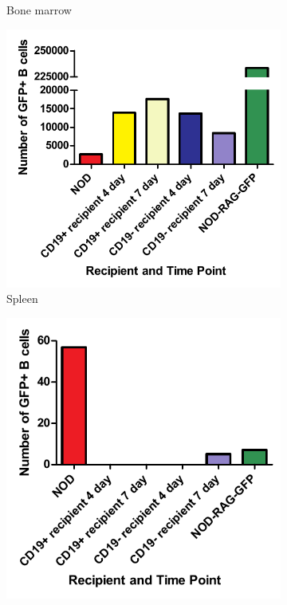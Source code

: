\begin{figure}
\begin{subfigure}{0.45\textwidth}
	\caption{Bone marrow}
	\label{subfig:BMGFPBcells}
	\end{subfigure}
	\begin{subfigure}{0.45\textwidth}
	\includegraphics[width=\textwidth]{Figures/SpleenGFPBcells.pdf}
	\caption{Spleen}
	\label{subfig:SpleenGFPBcells}
	\end{subfigure}
	\begin{subfigure}{0.45\textwidth}
	\includegraphics[width=\textwidth]{Figures/PLNGFPBcells.pdf}

\end{subfigure}
\end{figure}
